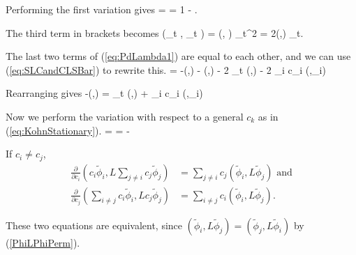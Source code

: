 \documentclass[Dissertation.tex]{subfiles}
\begin{document}
Performing the first variation gives
 =  = 1 - .
\label{eq:PdLambda1}
\eeq

\noindent The third term in brackets becomes
\beq
{} (_t , _t ) = (, )  _t^2 = 2(,) _t.
\eeq

\noindent The last two terms of (\ref{eq:PdLambda1}) are equal to each other, and we can use (\ref{eq:SLCandCLSBar}) to rewrite this.
 = -(,) - (,) - 2 _t (,) - 2 \sum_i c_i (,\tilde{\phi}_i)
\eeq

\noindent Rearranging gives
\beq
-(,) = _t (,) + \sum_i c_i (,\tilde{\phi}_i)
\label{eq:PdLambda}
\eeq

Now we perform the variation with respect to a general $c_k$ as in (\ref{eq:KohnStationary}).
 =  = -
\label{eq:PdCk1}
\eeq

If $c_i \ne c_j$,
\begin{subequations}
\begin{align}
\frac{\partial}{\partial c_i} (c_i \tilde{\phi}_i, L \sum_{j \ne i} c_j \tilde{\phi}_j) &= \sum_{j \ne i} c_j (\tilde{\phi}_i, L \tilde{\phi}_j) \text{ and} \\
\frac{\partial}{\partial c_j} (\sum_{i \ne j} c_i \tilde{\phi}_i, L c_j \tilde{\phi}_j) &= \sum_{i \ne j} c_i (\tilde{\phi}_i, L \tilde{\phi}_j).
\end{align}
\end{subequations}

\noindent These two equations are equivalent, since $\left( \tilde{\phi}_i, L \tilde{\phi}_j \right) = \left( \tilde{\phi}_j, L \tilde{\phi}_i \right)$ by (\ref{PhiLPhiPerm}).
\end{document}

